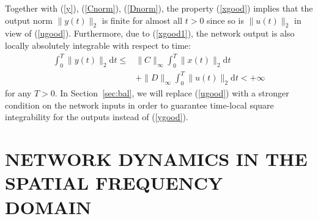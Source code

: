 \documentclass[letterpaper, 10pt, conference]{ieeeconf}  %
\def\<{\leqslant}           %
\def\re{\mathrm{e}}        %
\def\rd{\mathrm{d}}        %
\def\x{\times}
\begin{document}
Together with (\ref{y}),  (\ref{Cnorm}), (\ref{Dnorm}),  the property (\ref{xgood}) implies that the output norm $\|y(t)\|_2$ is finite for almost all $t>0$ since so is $\|u(t)\|_2$ in view of (\ref{ugood}). Furthermore, due to (\ref{xgood1}), the network output is also locally absolutely integrable with respect to time:
\begin{align}
\nonumber
    \int_0^T
    \|y(t)\|_2
    \rd t
    \< &
    \|C\|_{\infty}
    \int_0^T
    \|x(t)\|_2
    \rd t\\
\label{ygood}
    & +
    \|D\|_{\infty}
    \int_0^T
    \|u(t)\|_2
    \rd t
    <+\infty
\end{align}
for any $T>0$. In Section~\ref{sec:bal}, we will replace (\ref{ugood}) with a stronger condition on the network inputs in order to guarantee time-local square integrability for the outputs instead of (\ref{ygood}).




\section{NETWORK DYNAMICS IN THE SPATIAL FREQUENCY DOMAIN}\label{sec:freq}
\end{document}

